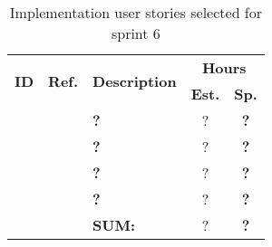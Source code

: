  \def\arraystretch{1.25}
 
\begin{longtable}{ccXcc}
  \label{tab:sprint6stories}\\[-6mm]
\caption{Implementation user stories selected for sprint 6}\\[-4mm]

\toprule[0.5mm]
\multirow{2}{*}{\textbf{ID}} &
\multirow{2}{*}{\textbf{Ref.}} & \multirow{2}{*}{\textbf{Description}} & \multicolumn{2}{c}{\textbf{Hours}} \\
 					& & & \textbf{Est.} & \textbf{Sp.} \\
\midrule
\textbf{} 	& 	& {\bf ?}			& ?	& \textbf{?} \\

\textbf{} 	& 	& {\bf ?}			& ?	& \textbf{?} \\

\textbf{} 	& 	& {\bf ?} 			& ?	& \textbf{?} \\	

\textbf{} 	& 	& {\bf ?} 			& ?	& \textbf{?} \\
	
\midrule
		
				&& \textbf{SUM:}		&	?	& \textbf{?}
 \\																			
\bottomrule[0.5mm]
\end{longtable}

